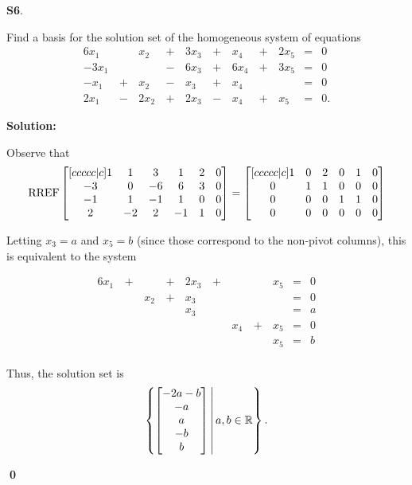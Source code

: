 \documentclass{article}
\newenvironment{problem}[1]
{
	\begin{flushleft}
	\textbf{#1}.
	\ignorespaces
}
{
	\end{flushleft}
}
\newenvironment{solution}
{
	\ignorespaces
	\textbf{Solution:}
}
{
	\ignorespacesafterend
	\begin{flushright}
	{\bfseries \qed}
	\end{flushright}
}
\begin{document}
\begin{problem}{S6}
Find a basis for the solution set of the homogeneous system of equations
\begin{alignat}{6}
x_1 &\,\,& x_2 &\,+\,& 3x_3 &\,+\,& x_4 &\,+\,& 2x_5 &=& 0 \\
-3x_1 &\,\,&  &\,-\,& 6x_3 &\,+\,&6 x_4 &\,+\,& 3x_5 &=& 0 \\
-x_1 &\,+\,& x_2 &\,-\,& x_3 &\,+\,& x_4 &\,\,&  &=& 0 \\
2x_1 &\,-\,& 2x_2 &\,+\,& 2x_3 &\,-\,& x_4 &\,+\,& x_5 &=& 0 .
\end{alignat}
\end{problem}
\begin{solution}
Observe that 
\[ \operatorname{RREF} 
		\begin{bmatrix}[ccccc|c]
		1 & 1 & 3 & 1 & 2 & 0\\
		-3 & 0 & -6 & 6 & 3 & 0\\
		-1 & 1 & -1 & 1 & 0 & 0\\
		2 & -2 & 2 & -1 & 1& 0 
		\end{bmatrix} = 
		\begin{bmatrix}[ccccc|c]
		1 & 0 & 2 & 0 & 1 &0\\ 
		0 & 1 & 1 & 0 & 0 &0\\
		0 & 0 & 0 & 1 & 1 &0\\
		0 & 0 & 0 & 0 & 0&0
		\end{bmatrix}  
\]

Letting $x_3=a$ and $x_5=b$ (since those correspond to the non-pivot columns), this is equivalent to the system 

\begin{alignat}{6}
x_1 &\,+\,&  &\,+\,& 2x_3 &\,+\,&  &\,\,& x_5 &=& 0 \\
 &\,\,& x_2 &\,+\,& x_3 &\,\,& &\,\,&  &=& 0 \\
 &\,\,&  &\,\,& x_3 &\,\,&  &\,\,&  &=& a \\
 &\,\,&  &\,\,&  &\,\,& x_4 &\,+\,& x_5 &=& 0 \\
 &\,\,&  &\,\,&  &\,\,&  &\,\,& x_5 &=& b \\
\end{alignat}

Thus, the solution set is 
\[ \left\{\begin{bmatrix} -2a-b \\ -a \\ a \\ -b \\ b \end{bmatrix}\,\middle|\,a,b \in \mathbb{R}\right\} .\]


\end{solution}
\end{document}
